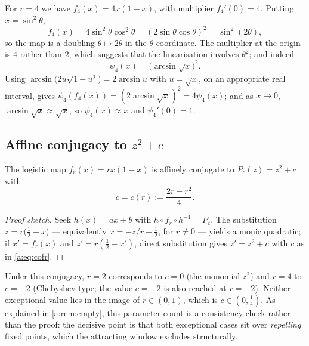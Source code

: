 For $r=4$ we have $f_4(x) = 4x(1-x)$, with multiplier $f_4'(0)=4$. Putting
$x=\sin^2\theta$,
\begin{equation*}
f_4(x) = 4\sin^2\theta\cos^2\theta = (2\sin\theta\cos\theta)^2 = \sin^2(2\theta),
\end{equation*}
so the map is a doubling $\theta\mapsto2\theta$ in the $\theta$ coordinate. The
multiplier at the origin is $4$ rather than $2$, which suggests that the
linearisation involves $\theta^2$; and indeed
\begin{equation}
\label{a:eq:psi4}
\psi_4(x) = \bigl(\arcsin\sqrt{x}\bigr)^2 .
\end{equation}
Using $\arcsin\bigl(2u\sqrt{1-u^2}\bigr) = 2\arcsin u$ with $u=\sqrt x$, on an
appropriate real interval, gives
$\psi_4(f_4(x)) = (2\arcsin\sqrt x)^2 = 4\psi_4(x)$; and as $x\to0$,
$\arcsin\sqrt x\approx\sqrt x$, so $\psi_4(x)\approx x$ and $\psi_4'(0)=1$.

\subsection{Affine conjugacy to \texorpdfstring{$z^2+c$}{z\textasciicircum 2+c}}
\label{a:app:affine}

\begin{lemma}
\label{a:lem:affine}
The logistic map $f_r(x) = rx(1-x)$ is affinely conjugate to $P_c(z) = z^2+c$ with
\begin{equation}
\label{a:eq:cofr}
c = c(r) := \frac{2r-r^2}{4} .
\end{equation}
\end{lemma}

\begin{proof}[Proof sketch]
Seek $h(x) = ax+b$ with $h\circ f_r\circ h^{-1} = P_c$. The substitution
$z = r\bigl(\tfrac12-x\bigr)$ --- equivalently $x = -z/r+\tfrac12$, for $r\neq0$ ---
yields a monic quadratic; if $x' = f_r(x)$ and $z' = r(\tfrac12-x')$, direct
substitution gives $z' = z^2+c$ with $c$ as in \cref{a:eq:cofr}.
\end{proof}

Under this conjugacy, $r=2$ corresponds to $c=0$ (the monomial $z^2$) and $r=4$ to
$c=-2$ (Chebyshev type; the value $c=-2$ is also reached at $r=-2$). Neither
exceptional value lies in the image of $r\in(0,1)$, which is $c\in(0,\tfrac14)$.
As explained in \cref{a:rem:empty}, this parameter count is a consistency check
rather than the proof: the decisive point is that both exceptional cases sit over
\emph{repelling} fixed points, which the attracting window excludes structurally.


